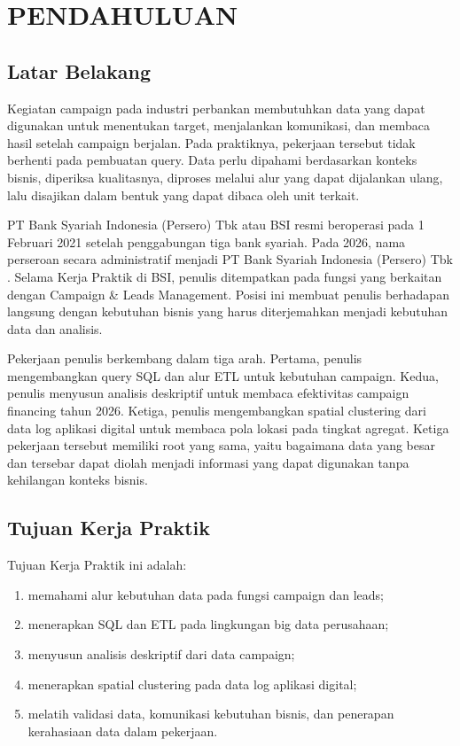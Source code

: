 \cleardoublepage
\chapter{PENDAHULUAN}
\label{chap:pendahuluan}

\section{Latar Belakang}
Kegiatan campaign pada industri perbankan membutuhkan data yang dapat digunakan untuk menentukan target, menjalankan komunikasi, dan membaca hasil setelah campaign berjalan. Pada praktiknya, pekerjaan tersebut tidak berhenti pada pembuatan query. Data perlu dipahami berdasarkan konteks bisnis, diperiksa kualitasnya, diproses melalui alur yang dapat dijalankan ulang, lalu disajikan dalam bentuk yang dapat dibaca oleh unit terkait.

PT Bank Syariah Indonesia (Persero) Tbk atau BSI resmi beroperasi pada 1 Februari 2021 setelah penggabungan tiga bank syariah. Pada 2026, nama perseroan secara administratif menjadi PT Bank Syariah Indonesia (Persero) Tbk \autocite{bsi2026}. Selama Kerja Praktik di BSI, penulis ditempatkan pada fungsi yang berkaitan dengan Campaign \& Leads Management. Posisi ini membuat penulis berhadapan langsung dengan kebutuhan bisnis yang harus diterjemahkan menjadi kebutuhan data dan analisis.

Pekerjaan penulis berkembang dalam tiga arah. Pertama, penulis mengembangkan query SQL dan alur ETL untuk kebutuhan campaign. Kedua, penulis menyusun analisis deskriptif untuk membaca efektivitas campaign financing tahun 2026. Ketiga, penulis mengembangkan spatial clustering dari data log aplikasi digital untuk membaca pola lokasi pada tingkat agregat. Ketiga pekerjaan tersebut memiliki root yang sama, yaitu bagaimana data yang besar dan tersebar dapat diolah menjadi informasi yang dapat digunakan tanpa kehilangan konteks bisnis.

\section{Tujuan Kerja Praktik}
Tujuan Kerja Praktik ini adalah:
\begin{enumerate}
\item memahami alur kebutuhan data pada fungsi campaign dan leads;
\item menerapkan SQL dan ETL pada lingkungan big data perusahaan;
\item menyusun analisis deskriptif dari data campaign;
\item menerapkan spatial clustering pada data log aplikasi digital;
\item melatih validasi data, komunikasi kebutuhan bisnis, dan penerapan kerahasiaan data dalam pekerjaan.
\end{enumerate}

